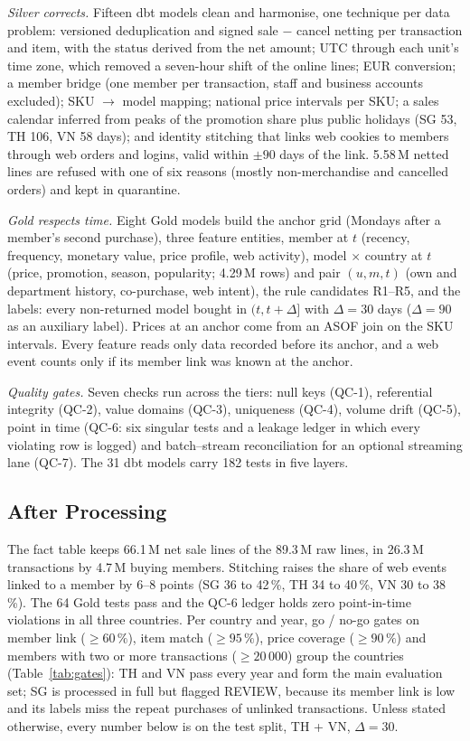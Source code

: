 \documentclass{ieeeaccess}
\begin{document}
\textit{Silver corrects.} Fifteen dbt models clean and harmonise, one technique per data problem: versioned deduplication and signed
sale $-$ cancel netting per transaction and item, with the status derived from the net amount; UTC through each unit's time zone,
which removed a seven-hour shift of the online lines; EUR conversion; a member bridge (one member per transaction, staff and business
accounts excluded); SKU $\to$ model mapping; national price intervals per SKU; a sales calendar inferred from peaks of the
promotion share plus public holidays (SG 53, TH 106, VN 58 days); and identity stitching that links web cookies to members through
web orders and logins, valid within $\pm 90$ days of the link. 5.58\,M netted lines are refused with one of six reasons (mostly
non-merchandise and cancelled orders) and kept in quarantine.

\textit{Gold respects time.} Eight Gold models build the anchor grid (Mondays after a member's second purchase), three feature
entities, member at $t$ (recency, frequency, monetary value, price profile, web activity), model $\times$ country at $t$ (price,
promotion, season, popularity; 4.29\,M rows) and pair $(u, m, t)$ (own and department history, co-purchase, web intent), the rule
candidates R1--R5, and the labels: every non-returned model bought in $(t, t+\Delta]$ with $\Delta = 30$ days ($\Delta = 90$ as an
auxiliary label). Prices at an anchor come from an ASOF join on the SKU intervals. Every feature reads only data recorded before
its anchor, and a web event counts only if its member link was known at the anchor.

\textit{Quality gates.} Seven checks run across the tiers: null keys (QC-1), referential integrity (QC-2), value domains (QC-3),
uniqueness (QC-4), volume drift (QC-5), point in time (QC-6: six singular tests and a leakage ledger in which every violating row is
logged) and batch--stream reconciliation for an optional streaming lane (QC-7). The 31 dbt models carry 182 tests in five layers.

\subsection{After Processing}
The fact table keeps 66.1\,M net sale lines of the 89.3\,M raw lines, in 26.3\,M transactions by 4.7\,M buying members. Stitching
raises the share of web events linked to a member by 6--8 points (SG 36 to 42\,\%, TH 34 to 40\,\%, VN 30 to 38\,\%). The 64 Gold
tests pass and the QC-6 ledger holds zero point-in-time violations in all three countries. Per country and year, go / no-go gates
on member link ($\ge 60\,\%$), item match ($\ge 95\,\%$), price coverage ($\ge 90\,\%$) and members with two or more transactions
($\ge 20\,000$) group the countries (Table~\ref{tab:gates}): TH and VN pass every year and form the main evaluation set; SG is
processed in full but flagged REVIEW, because its member link is low and its labels miss the repeat purchases of unlinked
transactions. Unless stated otherwise, every number below is on the test split, TH + VN, $\Delta = 30$.
\end{document}
